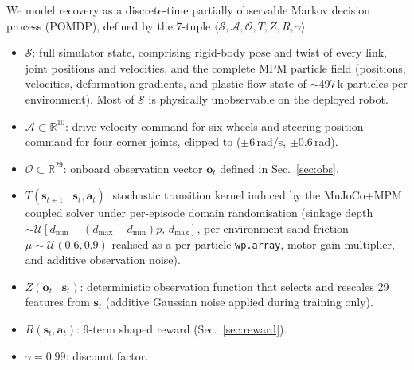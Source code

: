 \documentclass[conference]{IEEEtran}
\begin{document}
We model recovery as a discrete-time partially observable Markov decision
process (POMDP), defined by the 7-tuple
$\langle \mathcal{S}, \mathcal{A}, \mathcal{O}, T, Z, R, \gamma \rangle$:
\begin{itemize}\setlength{\itemsep}{1pt}
  \item $\mathcal{S}$: full simulator state, comprising rigid-body pose and
        twist of every link, joint positions and velocities, and the complete
        MPM particle field (positions, velocities, deformation gradients, and
        plastic flow state of $\sim$497\,k particles per environment). Most of
        $\mathcal{S}$ is physically unobservable on the deployed robot.
  \item $\mathcal{A} \subset \mathbb{R}^{10}$: drive velocity command for six
        wheels and steering position command for four corner joints, clipped
        to ($\pm 6$\,rad/s, $\pm 0.6$\,rad).
  \item $\mathcal{O} \subset \mathbb{R}^{29}$: onboard observation vector
        $\mathbf{o}_t$ defined in Sec.~\ref{sec:obs}.
  \item $T(\mathbf{s}_{t+1}\!\mid\!\mathbf{s}_t,\mathbf{a}_t)$: stochastic
        transition kernel induced by the MuJoCo+MPM coupled solver under
        per-episode domain randomisation (sinkage depth $\sim
        \mathcal{U}[d_{\min}{+}(d_{\max}{-}d_{\min})p,\,d_{\max}]$,
        per-environment sand friction $\mu \sim \mathcal{U}(0.6, 0.9)$
        realised as a per-particle \texttt{wp.array}, motor gain
        multiplier, and additive observation noise).
  \item $Z(\mathbf{o}_t\!\mid\!\mathbf{s}_t)$: deterministic observation
        function that selects and rescales 29 features from $\mathbf{s}_t$
        (additive Gaussian noise applied during training only).
  \item $R(\mathbf{s}_t,\mathbf{a}_t)$: 9-term shaped reward
        (Sec.~\ref{sec:reward}).
  \item $\gamma = 0.99$: discount factor.
\end{itemize}
\end{document}
